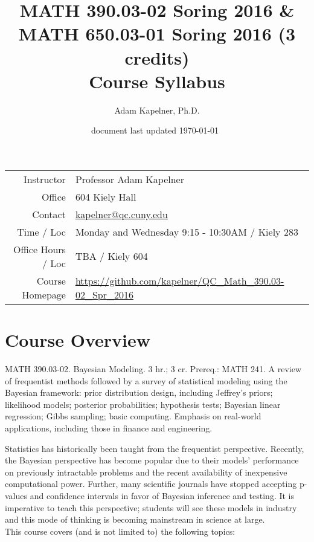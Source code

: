 \documentclass[12pt]{article}
\title{MATH 390.03-02 Soring 2016 \& \\  MATH 650.03-01 Soring 2016 (3 credits) \\ Course Syllabus}
\author[]{Adam Kapelner, Ph.D.}
\affil[]{Queens College, City University of New York}
\date{\small document last updated \today ~\currenttime }
\begin{document}
\maketitle

\begin{table}[htp]
\centering
\begin{tabular}{rl}
Instructor & Professor Adam Kapelner \\
Office & 604 Kiely Hall \\
Contact & \url{kapelner@qc.cuny.edu} \\
Time / Loc & Monday and Wednesday 9:15 - 10:30AM / Kiely 283 \\
Office Hours / Loc & TBA / Kiely 604 \\
Course Homepage & \href{https://github.com/kapelner/QC_Math_390.03-02_Spr_2016}{https://github.com/kapelner/QC\_Math\_390.03-02\_Spr\_2016} \\
\end{tabular}
\end{table}

\section*{Course Overview}

MATH 390.03-02. Bayesian Modeling. 3 hr.; 3 cr. Prereq.: MATH 241. A review of frequentist methods followed by a survey of statistical modeling using the Bayesian framework: prior distribution design, including Jeffrey’s priors; likelihood models; posterior probabilities; hypothesis tests; Bayesian linear regression; Gibbs sampling; basic computing.  Emphasis on real-world applications, including those in finance and engineering.

Statistics has historically been taught from the frequentist perspective. Recently, the Bayesian perspective has become popular due to their models' performance on previously intractable problems and the recent availability of inexpensive computational power. Further, many scientific journals have stopped accepting p-values and confidence intervals in favor of Bayesian inference and testing. It is imperative to teach this perspective; students will see these models in industry and this mode of thinking is becoming mainstream in science at large. \\

This course covers (and is not limited to) the following topics:
\end{document}
